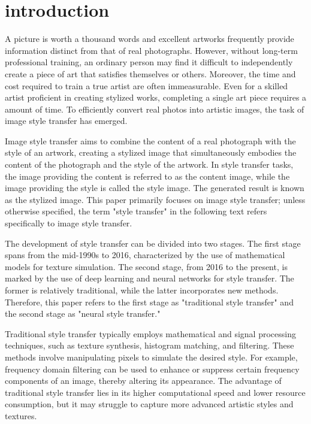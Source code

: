 \section{introduction}

A picture is worth a thousand words and excellent artworks frequently provide information distinct from that of real photographs. However, without long-term professional training, an ordinary person may find it difficult to independently create a piece of art that satisfies themselves or others. Moreover, the time and cost required to train a true artist are often immeasurable. Even for a skilled artist proficient in creating stylized works, completing a single art piece requires a amount of time. To efficiently convert real photos into artistic images, the task of image style transfer has emerged.

Image style transfer aims to combine the content of a real photograph with the style of an artwork, creating a stylized image that simultaneously embodies the content of the photograph and the style of the artwork. In style transfer tasks, the image providing the content is referred to as the content image, while the image providing the style is called the style image. The generated result is known as the stylized image. This paper primarily focuses on image style transfer; unless otherwise specified, the term "style transfer" in the following text refers specifically to image style transfer.

The development of style transfer can be divided into two stages. The first stage spans from the mid-1990s\citep{01jing2019neural} to 2016\citep{02gatys2016image}, characterized by the use of mathematical models for texture simulation. The second stage, from 2016\citep{02gatys2016image} to the present, is marked by the use of deep learning and neural networks for style transfer. The former is relatively traditional, while the latter incorporates new methods. Therefore, this paper refers to the first stage as "traditional style transfer" and the second stage as "neural style transfer."

Traditional style transfer typically employs mathematical and signal processing techniques, such as texture synthesis, histogram matching, and filtering. These methods involve manipulating pixels to simulate the desired style. For example, frequency domain filtering can be used to enhance or suppress certain frequency components of an image, thereby altering its appearance. The advantage of traditional style transfer lies in its higher computational speed and lower resource consumption, but it may struggle to capture more advanced artistic styles and textures.

